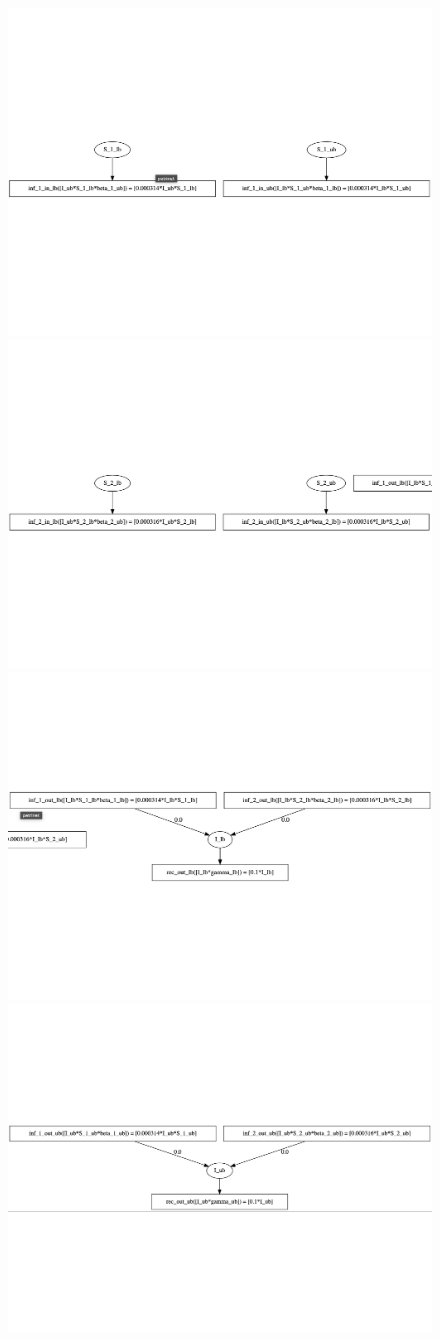 \begin{figure}[t]
    \centering
    \includegraphics[width=0.6\linewidth,clip]{fig/sir/sir_bounded_stratified_1.pdf}
    \includegraphics[width=0.6\linewidth,clip]{fig/sir/sir_bounded_stratified_2.pdf}
    \includegraphics[width=0.6\linewidth,clip]{fig/sir/sir_bounded_stratified_3.pdf}
    \includegraphics[width=0.6\linewidth,clip]{fig/sir/sir_bounded_stratified_4.pdf}

\end{figure}

